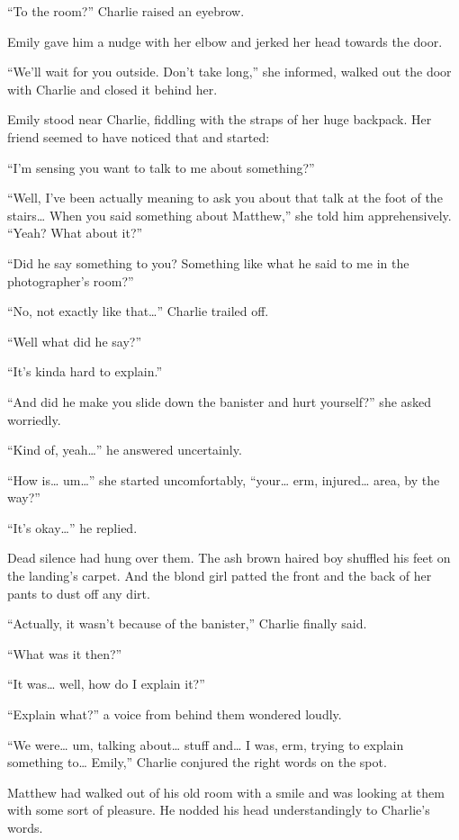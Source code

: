 “To the room?” Charlie raised an eyebrow.

Emily gave him a nudge with her elbow and jerked her head towards the door.

“We’ll wait for you outside. Don’t take long,” she informed, walked out the door with Charlie and closed it behind her.

\bigskip

Emily stood near Charlie, fiddling with the straps of her huge backpack. Her friend seemed to have noticed that and started:

“I’m sensing you want to talk to me about something?”

“Well, I’ve been actually meaning to ask you about that talk at the foot of the stairs… When you said something about Matthew,” she told him apprehensively.
“Yeah? What about it?”

“Did he say something to you? Something like what he said to me in the photographer’s room?”

“No, not exactly like that…” Charlie trailed off.

“Well what did he say?”

“It’s kinda hard to explain.”

“And did he make you slide down the banister and hurt yourself?” she asked worriedly.

“Kind of, yeah…” he answered uncertainly.

“How is… um…” she started uncomfortably, “your… erm, injured… area, by the way?”

“It’s okay…” he replied.

Dead silence had hung over them. The ash brown haired boy shuffled his feet on the landing’s carpet. And the blond girl patted the front and the back of her pants to dust off any dirt.

“Actually, it wasn’t because of the banister,” Charlie finally said.

“What was it then?”

“It was… well, how do I explain it?”

“Explain what?” a voice from behind them wondered loudly.

“We were… um, talking about… stuff and… I was, erm, trying to explain something to… Emily,” Charlie conjured the right words on the spot.

Matthew had walked out of his old room with a smile and was looking at them with some sort of pleasure. He nodded his head understandingly to Charlie’s words.

